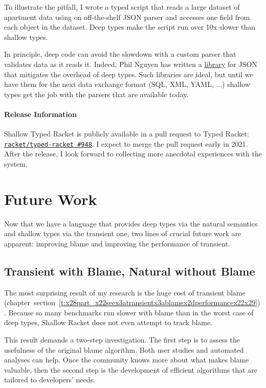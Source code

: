 \documentclass[ twoside,open=right,titlepage,numbers=noenddot,headinclude,%
                footinclude=true,cleardoublepage=empty,abstract=off,
                BCOR=5mm,paper=a4,fontsize=11pt,%
                ngerman,american,%
                parts,pdfspacing]{scrreprt}
\newcommand{\sectionNewpage}{}
\newcommand{\SecRef}[2]{section~#1}
\newcommand{\SecRefLocal}[3]{\hyperref[#1]{\SecRef{#2}{#3}}}
\newcommand{\Scribtexttt}[1]{{\texttt{#1}}}
\let\SOriginalthesubsection\thesubsection
\let\SOriginalthesubsubsection\thesubsubsection
\newcommand{\Ssection}[2]{\section[#1]{#2}\let\thesubsection\SOriginalthesubsection}
\newcommand{\Ssubsection}[2]{\subsection[#1]{#2}\let\thesubsubsection\SOriginalthesubsubsection}
\newcommand{\Ssubsubsubsectionstar}[1]{{\bf #1}}
\newcommand{\Ssubsubsubsectionstarx}[2]{\Ssubsubsubsectionstar{#2}}
\renewcommand{\Ssection}[2]{\chapter[#1]{#2}}
\renewcommand{\Ssubsection}[2]{\section[#1]{#2}}
\renewcommand{\Ssubsubsubsectionstar}[1]{\subsubsection*{#1}}
\renewcommand{\Ssubsubsubsectionstarx}[2]{\Ssubsubsubsectionstar{#2}\addcontentsline{toc}{subsubsection}{#1}}
\renewcommand{\SecRefLocal}[3]{section~\ref{#1}}
\begin{document}
To illustrate the pitfall, I wrote a typed script that reads a large dataset of
 apartment data using on off{-}the{-}shelf JSON parser and accesses one field
 from each object in the dataset.
Deep types make the script run over 10x slower than shallow types.

In principle, deep code can avoid the slowdown with a custom parser
 that validates data as it reads it.
Indeed, Phil Nguyen has written a \href{https://github.com/philnguyen/json-type-provider}{library}
 for JSON that mitigates the overhead of deep types.
Such libraries are ideal, but until we have them for the next data exchange
 format (SQL, XML, YAML, ...) shallow types get the job with the parsers
 that are available today.

\Ssubsubsubsectionstarx{Release Information}{Release Information}\label{t:x28part_x22secx3abothx3aperfx3areleasex22x29}

Shallow Typed Racket is publicly available in a pull request to Typed Racket:
\href{https://github.com/racket/typed-racket/pull/948}{\Scribtexttt{racket/typed{-}racket \#948}}.
I expect to merge the pull request early in 2021.
After the release, I look forward to collecting more anecdotal experiences
 with the system.

\sectionNewpage

\Ssection{Future Work}{Future Work}\label{t:x28part_x22chapx3afuturex22x29}

Now that we have a language that provides deep types via the natural
 semantics and shallow types via the transient one, two lines of
 crucial future work are apparent: improving blame and improving the performance
 of transient.

\Ssubsection{Transient with Blame, Natural without Blame}{Transient with Blame, Natural without Blame}\label{t:x28part_x22Transientx5fwithx5fBlamex5fx5fNaturalx5fwithoutx5fBlamex22x29}

The most surprising result of my research is the
 huge cost of transient blame (chapter~\SecRefLocal{t:x28part_x22secx3atransientx3ablamex2dperformancex22x29}{5.4.4}{Blame Performance}).
Because so many benchmarks run slower with blame than in the worst case
 of deep types, Shallow Racket does not even attempt to track blame.

This result demands a two{-}step investigation.
The first step is to assess the usefulness of the original blame algorithm.
Both user studies and automated analyses can help.
Once the community knows more about what makes blame valuable,
 then the second step is the development of efficient algorithms that are
  tailored to developers{'} needs.
\end{document}
